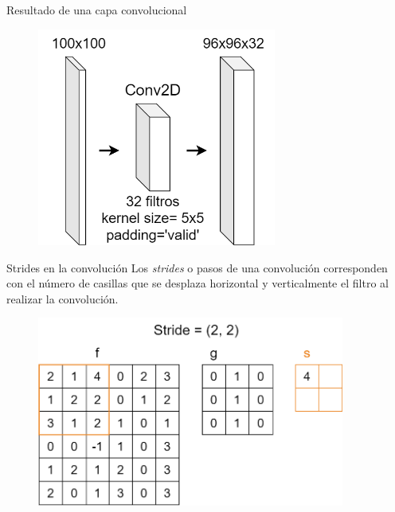 \begin{frame}{Resultado de una capa convolucional}
\begin{figure}
    \centering
    \includegraphics[width=0.7\textwidth]{Slides/figures/Tema 3/ConvDimensions_5.png}
\end{figure}
\end{frame}

\begin{frame}{Strides en la convolución}
Los \alert{\textit{strides}} o pasos de una convolución corresponden con el número de casillas que se desplaza \alert{horizontal} y \alert{verticalmente} el filtro al realizar la convolución.

\begin{figure}
    \centering
    \includegraphics[width=0.9\textwidth]{Slides/figures/Tema 2/Strides2x2_2.png}
\end{figure}
\end{frame}

